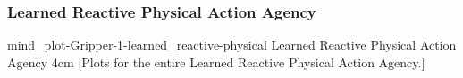 {\newpage
  \noindent\begin{minipage}{\textwidth}
    \subsubsection{Learned Reactive Physical Action Agency}
    \experimentcausegroupplots{\dataappendixmaxtime}
                           {\dataappendixexperimentonemaxtime}
                           {\dataappendixexperimenttwomaxtime}
                           {\dataappendixexperimentthreemaxtime}
                           {\dataappendixexperimentonename}
                           {\dataappendixexperimenttwoname}
                           {\dataappendixexperimentthreename}
                           {\dataappendixexperimentoneprettyname}
                           {\dataappendixexperimenttwoprettyname}
                           \experimentcausegroupplotscontinued{\dataappendixexperimentthreeprettyname}
                                                              {mind_plot-Gripper-1-learned_reactive-physical}
                                                              {Learned Reactive Physical Action Agency}
                                                              {\experimentdatacommontablereference}
                                                              {4cm}
    \experimentdatablocksworldexample
    [Plots for the entire
      Learned Reactive Physical Action Agency.]{}
  \label{figure:mind_plot-Gripper-1-learned_reactive-physical}
  \end{minipage}
}
